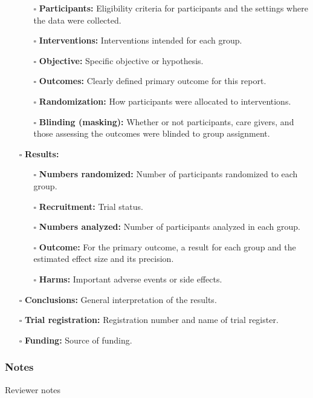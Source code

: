 \documentclass[11pt]{article}
\def\tightlist{}
\begin{document}
\begin{Form}
\begin{itemize}
  \begin{itemize}
  \tightlist
  \item[$\square$]
    \textbf{Participants:} Eligibility criteria for participants and the
    settings where the data were collected.
  \item[$\square$]
    \textbf{Interventions:} Interventions intended for each group.
  \item[$\square$]
    \textbf{Objective:} Specific objective or hypothesis.
  \item[$\square$]
    \textbf{Outcomes:} Clearly defined primary outcome for this report.
  \item[$\square$]
    \textbf{Randomization:} How participants were allocated to
    interventions.
  \item[$\square$]
    \textbf{Blinding (masking):} Whether or not participants, care
    givers, and those assessing the outcomes were blinded to group
    assignment.
  \end{itemize}
\item[$\square$]
  \textbf{Results:}

  \begin{itemize}
  \tightlist
  \item[$\square$]
    \textbf{Numbers randomized:} Number of participants randomized to
    each group.
  \item[$\square$]
    \textbf{Recruitment:} Trial status.
  \item[$\square$]
    \textbf{Numbers analyzed:} Number of participants analyzed in each
    group.
  \item[$\square$]
    \textbf{Outcome:} For the primary outcome, a result for each group
    and the estimated effect size and its precision.
  \item[$\square$]
    \textbf{Harms:} Important adverse events or side effects.
  \end{itemize}
\item[$\square$]
  \textbf{Conclusions:} General interpretation of the results.
\item[$\square$]
  \textbf{Trial registration:} Registration number and name of trial
  register.
\item[$\square$]
  \textbf{Funding:} Source of funding.
\end{itemize}

\subsubsection{Notes}\label{notes}

{Reviewer notes}

\end{Form}
\end{document}
